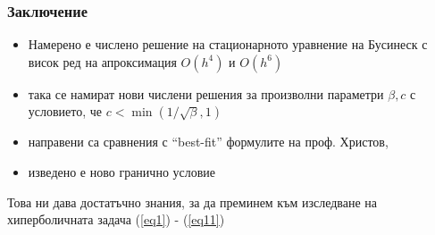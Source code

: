 \documentclass{beamer}
\newcommand{\rf}[1]{(\ref{#1})}
\begin{document}
\begin{frame}
\frametitle{Заключение}

\begin{itemize}
  \item Намерено е числено решение на стационарното уравнение на Бусинеск с висок ред на апроксимация $O(h^4)$ и $O(h^6)$
  \item така се намират нови числени решения за произволни параметри $\beta, c$ с условието, че $c < \min (1/ \sqrt{\beta},1)$
  \item направени са сравнения с ``best-fit'' формулите на проф. Христов,
  \item изведено е ново гранично условие
\end{itemize}

Това ни дава достатъчно знания, за да преминем към изследване на хиперболичната задача \rf{eq1} - \rf{eq11}
\end{frame}
\end{document}
